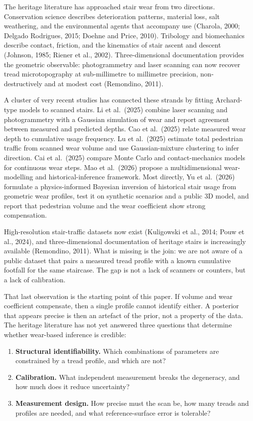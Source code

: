 \documentclass[
]{article}
\providecommand{\tightlist}{%
  \setlength{\itemsep}{0pt}\setlength{\parskip}{0pt}}
\begin{document}
The heritage literature has approached stair wear from two directions.
Conservation science describes deterioration patterns, material loss,
salt weathering, and the environmental agents that accompany use
(Charola, 2000; Delgado Rodrigues, 2015; Doehne and Price, 2010).
Tribology and biomechanics describe contact, friction, and the
kinematics of stair ascent and descent (Johnson, 1985; Riener et al.,
2002). Three-dimensional documentation provides the geometric
observable: photogrammetry and laser scanning can now recover tread
microtopography at sub-millimetre to millimetre precision,
non-destructively and at modest cost (Remondino, 2011).

A cluster of very recent studies has connected these strands by fitting
Archard-type models to scanned stairs. Li et al.~(2025) combine laser
scanning and photogrammetry with a Gaussian simulation of wear and
report agreement between measured and predicted depths. Cao et
al.~(2025) relate measured wear depth to cumulative usage frequency. Lu
et al.~(2025) estimate total pedestrian traffic from scanned wear volume
and use Gaussian-mixture clustering to infer direction. Cai et
al.~(2025) compare Monte Carlo and contact-mechanics models for
continuous wear steps. Mao et al.~(2026) propose a multidimensional
wear-modelling and historical-inference framework. Most directly, Yu et
al.~(2026) formulate a physics-informed Bayesian inversion of historical
stair usage from geometric wear profiles, test it on synthetic scenarios
and a public 3D model, and report that pedestrian volume and the wear
coefficient show strong compensation.

High-resolution stair-traffic datasets now exist (Kuligowski et al.,
2014; Pouw et al., 2024), and three-dimensional documentation of
heritage stairs is increasingly available (Remondino, 2011). What is
missing is the join: we are not aware of a public dataset that pairs a
measured tread profile with a known cumulative footfall for the same
staircase. The gap is not a lack of scanners or counters, but a lack of
calibration.

That last observation is the starting point of this paper. If volume and
wear coefficient compensate, then a single profile cannot identify
either. A posterior that appears precise is then an artefact of the
prior, not a property of the data. The heritage literature has not yet
answered three questions that determine whether wear-based inference is
credible:

\begin{enumerate}
\def\labelenumi{\arabic{enumi}.}
\tightlist
\item
  \textbf{Structural identifiability.} Which combinations of parameters
  are constrained by a tread profile, and which are not?
\item
  \textbf{Calibration.} What independent measurement breaks the
  degeneracy, and how much does it reduce uncertainty?
\item
  \textbf{Measurement design.} How precise must the scan be, how many
  treads and profiles are needed, and what reference-surface error is
  tolerable?
\end{enumerate}
\end{document}
